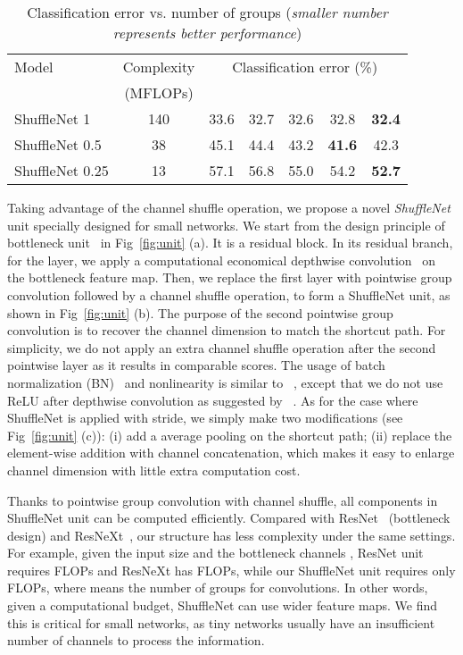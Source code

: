 \documentclass[10pt,twocolumn,letterpaper]{article}
\begin{document}
\begin{table*}[t]
	\begin{center}
		\begin{tabular}{l|c|ccccc}
			\hline
			Model & Complexity & \multicolumn{5}{c}{Classification error (\%)} \\
& (MFLOPs) &  &  &  &  &  \\
			\hline
			\hline
			ShuffleNet 1 & 140 & 33.6 & 32.7 & 32.6 & 32.8 & \textbf{32.4} \\
			ShuffleNet 0.5 & 38	& 45.1 & 44.4 & 43.2 & \textbf{41.6} & 42.3 \\
			ShuffleNet 0.25 & 13 & 57.1 & 56.8 & 55.0  & 54.2 & \textbf{52.7} \\
			\hline
		\end{tabular}
	\end{center}
	\caption{Classification error vs. number of groups  (\emph{smaller number represents better performance})}
	\label{tbl:groupconv}
\end{table*}

Taking advantage of the channel shuffle operation, we propose a novel \emph{ShuffleNet} unit specially designed for small networks. We start from the design principle of bottleneck unit~\cite{he2016deep} in Fig~\ref{fig:unit} (a). It is a residual block. In its residual branch, for the  layer, we apply a computational economical  depthwise convolution~\cite{chollet2016xception} on the bottleneck feature map. Then, we replace the first  layer with pointwise group convolution followed by a channel shuffle operation, to form a ShuffleNet unit, as shown in Fig~\ref{fig:unit} (b). The purpose of the second pointwise group convolution is to recover the channel dimension to match the shortcut path. For simplicity, we do not apply an extra channel shuffle operation after the second pointwise layer as it results in comparable scores. The usage of batch normalization (BN)~\cite{ioffe2015batch} and nonlinearity is similar to ~\cite{he2016deep,xie2016aggregated}, except that we do not use ReLU after depthwise convolution as suggested by ~\cite{chollet2016xception}. As for the case where ShuffleNet is applied with stride, we simply make two modifications (see Fig~\ref{fig:unit} (c)): (i) add a  average pooling on the shortcut path; (ii) replace the element-wise addition with channel concatenation, which makes it easy to enlarge channel dimension with little extra computation cost. 



Thanks to pointwise group convolution with channel shuffle, all components in ShuffleNet unit can be computed efficiently. Compared with ResNet~\cite{he2016deep} (bottleneck design) and ResNeXt~\cite{xie2016aggregated}, our structure has less complexity under the same settings. For example, given the input size  and the bottleneck channels , ResNet unit requires  FLOPs and ResNeXt has  FLOPs, while our ShuffleNet unit requires only  FLOPs, where  means the number of groups for convolutions. In other words, given a computational budget, ShuffleNet can use wider feature maps. We find this is critical for small networks, as tiny networks usually have an insufficient number of channels to process the information.
\end{document}
